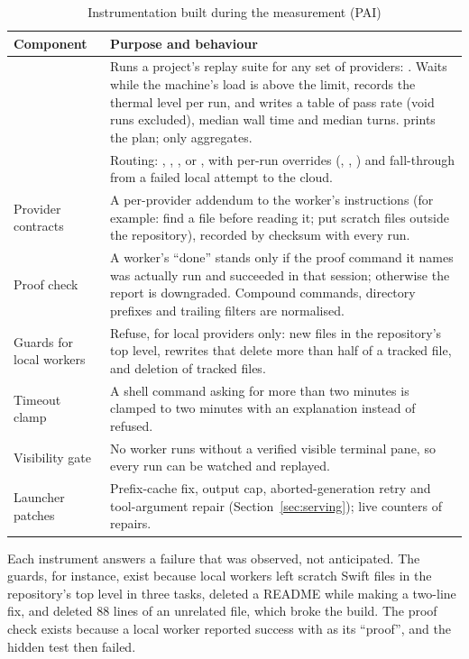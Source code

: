 \begin{table}[htbp]
\centering
\small
\caption{Instrumentation built during the measurement (PAI)}\label{tab:instrumentation}
\begin{tabular}{P{3.6cm}P{10.6cm}}
\toprule
Component & Purpose and behaviour \\
\midrule
{} & Runs a project's replay suite for any set of providers: . Waits while the machine's load is above the limit, records the thermal level per run, and writes a table of pass rate (void runs excluded), median wall time and median turns.  prints the plan;  only aggregates. \\
 & Routing: , , ,  or , with per-run overrides (, , ) and fall-through from a failed local attempt to the cloud. \\
Provider contracts & A per-provider addendum to the worker's instructions (for example: find a file before reading it; put scratch files outside the repository), recorded by checksum with every run. \\
Proof check & A worker's ``done'' stands only if the proof command it names was actually run and succeeded in that session; otherwise the report is downgraded. Compound commands, directory prefixes and trailing filters are normalised. \\
Guards for local workers & Refuse, for local providers only: new files in the repository's top level, rewrites that delete more than half of a tracked file, and deletion of tracked files. \\
Timeout clamp & A shell command asking for more than two minutes is clamped to two minutes with an explanation instead of refused. \\
Visibility gate & No worker runs without a verified visible terminal pane, so every run can be watched and replayed. \\
Launcher patches & Prefix-cache fix, output cap, aborted-generation retry and tool-argument repair (Section~\ref{sec:serving}); live counters of repairs. \\
\bottomrule
\end{tabular}
\end{table}

Each instrument answers a failure that was observed, not anticipated. The guards, for instance, exist because local
workers left scratch Swift files in the repository's top level in three tasks, deleted a README while making a two-line
fix, and deleted 88 lines of an unrelated file, which broke the build. The proof check exists because a local worker
reported success with  as its ``proof'', and the hidden test then failed.

